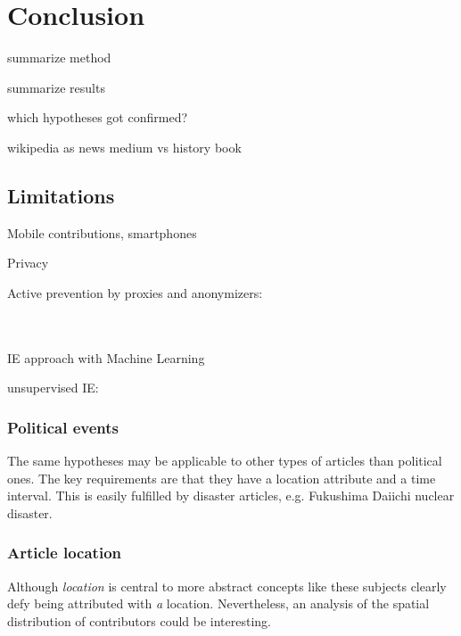\chapter{Conclusion}\label{ch:conclusion}

\begin{todos}
	\item summarize method
	\item summarize results
	\item which hypotheses got confirmed? 
    \item wikipedia as news medium vs history book
\end{todos}


\section{Limitations}

\begin{todos}
    \item Mobile contributions, smartphones
    \item Privacy
    \item Active prevention by proxies and anonymizers: 
    \\  
    \\ 
    \\ 
        \item IE approach with Machine Learning 
    \item unsupervised IE: 

\end{todos}



\subsection{Political events}
The same hypotheses may be applicable to other types of articles than political ones.
The key requirements are that they have a location attribute and a time interval.
This is easily fulfilled by disaster articles, e.g. Fukushima Daiichi nuclear disaster.

\subsection{Article location}
Although \emph{location} is central to more abstract concepts like  these subjects clearly defy being attributed with \emph{a} location.
Nevertheless, an analysis of the spatial distribution of contributors could be interesting. 

